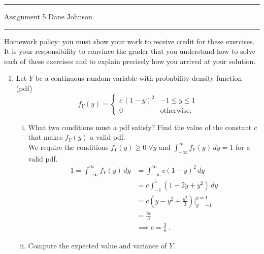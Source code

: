 \documentclass[letterpaper,12pt,fleqn]{article}
\begin{document}
\pagestyle{empty}

\hrule \vspace{0.5em}
 \hfill Assignment 5 \newline Dane Johnson \newline \hrule

\vspace{1em}

Homework policy: you must show your work to receive credit for these exercises.  It is your responsibility to convince the grader that you understand how to solve each of these exercises and to explain precisely how you arrived at your solution.

\vspace{1em}

\begin{enumerate}

\item Let $Y$ be a continuous random variable with probability density function (pdf)
\begin{equation*}
f_{Y}(y) = \begin{cases} c \, (1 - y)^{2} & -1 \leq y \leq 1 \\ 0 & \mbox{otherwise.} \end{cases}
\end{equation*}

\begin{enumerate}[(i)]
\item What two conditions must a pdf satisfy? Find the value of the constant $c$ that makes $f_{Y}(y)$ a valid pdf. \\

We require the conditions $f_Y(y) \geq 0 \; \forall y$ and $\int_{-\infty}^{\infty} f_Y(y)\,dy = 1$ for a valid pdf. 
\begin{align*}
1 = \int_{-\infty}^{\infty} f_Y(y)\,dy &= \int_{-\infty}^{\infty} c(1-y)^2\,dy \\ &= c\int_{-1}^{1} (1-2y+y^2)\,dy \\
&= c(y - y^2 + \frac{y^3}{3}) \Big|_{y = -1}^{y = 1} \\
&= \frac{8c}{3} \\ & \implies c = \frac{3}{8}\;.
\end{align*}

\item Compute the expected value and variance of $Y$.


\end{enumerate}
\end{enumerate}
\end{document}

